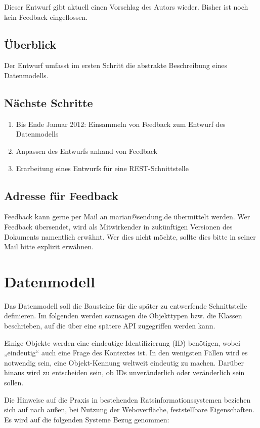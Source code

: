 Dieser Entwurf gibt aktuell einen Vorschlag des Autors wieder. Bisher
ist noch kein Feedback eingeflossen.

\subsection{Überblick}

Der Entwurf umfasst im ersten Schritt die abstrakte Beschreibung eines
Datenmodells.

\subsection{Nächste Schritte}

\begin{enumerate}[1.]
\item
  Bis Ende Januar 2012: Einsammeln von Feedback zum Entwurf des
  Datenmodells
\item
  Anpassen des Entwurfs anhand von Feedback
\item
  Erarbeitung eines Entwurfs für eine REST-Schnittstelle
\end{enumerate}

\subsection{Adresse für Feedback}

Feedback kann gerne per Mail an marian@sendung.de übermittelt werden.
Wer Feedback übersendet, wird als Mitwirkender in zukünftigen Versionen
des Dokuments namentlich erwähnt. Wer dies nicht möchte, sollte dies
bitte in seiner Mail bitte explizit erwähnen.

\section{Datenmodell}

Das Datenmodell soll die Bausteine für die später zu entwerfende
Schnittstelle definieren. Im folgenden werden sozusagen die Objekttypen
bzw. die Klassen beschrieben, auf die über eine spätere API zugegriffen
werden kann.

Einige Objekte werden eine eindeutige Identifizierung (ID) benötigen,
wobei „eindeutig`` auch eine Frage des Kontextes ist. In den wenigsten
Fällen wird es notwendig sein, eine Objekt-Kennung weltweit eindeutig zu
machen. Darüber hinaus wird zu entscheiden sein, ob IDs unveränderlich
oder veränderlich sein sollen.

Die Hinweise auf die Praxis in bestehenden Ratsinformationssystemen
beziehen sich auf nach außen, bei Nutzung der Weboverfläche,
feststellbare Eigenschaften. Es wird auf die folgenden Systeme Bezug
genommen:

